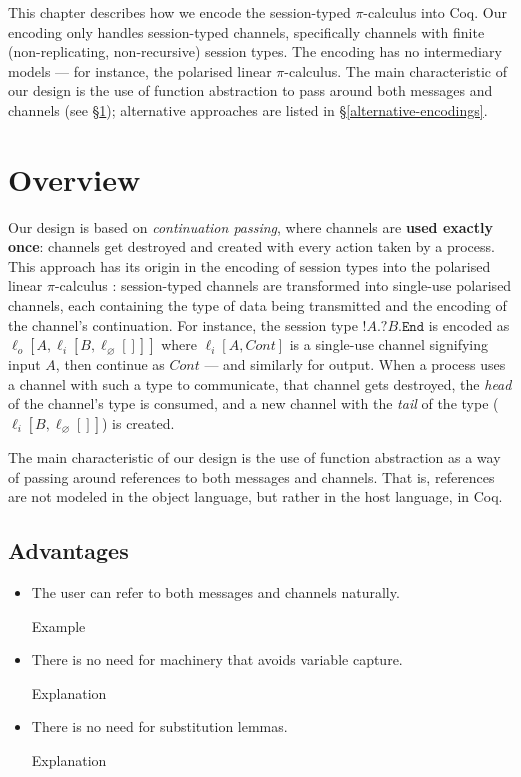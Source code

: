 \documentclass{mproj}
\newcommand{\picalc}{$\pi$-calculus}
\newcommand{\type}{\texttt}
\newcommand{\End}{\type{End}}
\newcommand{\Send}[1]{!#1.}
\newcommand{\Recv}[1]{?#1.}
\renewcommand{\emptyset}{\varnothing}
\begin{document}
This chapter describes how we encode the session-typed \picalc{} into Coq. Our encoding only handles session-typed channels, specifically channels with finite (non-replicating, non-recursive) session types. The encoding has no intermediary models --- for instance, the polarised linear \picalc{}. The main characteristic of our design is the use of function abstraction to pass around both messages and channels (see \S \ref{overview}); alternative approaches are listed in \S \ref{alternative-encodings}.

\section{Overview}\label{overview}

Our design is based on \emph{continuation passing}, where channels are \textbf{used exactly once}: channels get destroyed and created with every action taken by a process. This approach has its origin in the encoding of session types into the polarised linear \picalc{} \cite{Dardha2016, otherwork}: session-typed channels are transformed into single-use polarised channels, each containing the type of data being transmitted and the encoding of the channel's continuation. For instance, the session type $\Send{A} \Recv{B} \End$ is encoded as $\ell_o [A,\ell_i [B,\ell_\emptyset []]]$ where $\ell_i [A, Cont]$ is a single-use channel signifying input $A$, then continue as $Cont$ --- and similarly for output. When a process uses a channel with such a type to communicate, that channel gets destroyed, the \emph{head} of the channel's type is consumed, and a new channel with the \emph{tail} of the type ($\ell_i [B, \ell_\emptyset []]$) is created.

The main characteristic of our design is the use of function abstraction as a way of passing around references to both messages and channels. That is, references are not modeled in the object language, but rather in the host language, in Coq.

\subsection{Advantages}

\begin{itemize}
    \item The user can refer to both messages and channels naturally. 

        Example

    \item There is no need for machinery that avoids variable capture.

        Explanation

    \item There is no need for substitution lemmas.

        Explanation

\end{itemize}
\end{document}

